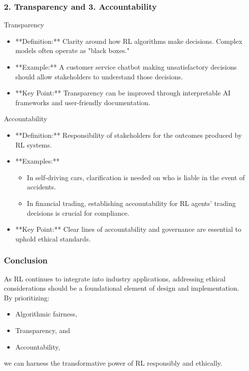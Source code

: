 \documentclass[aspectratio=169]{beamer}
\begin{document}
\begin{frame}[fragile]
    \frametitle{2. Transparency and 3. Accountability}
    \begin{block}{Transparency}
        \begin{itemize}
            \item **Definition:** Clarity around how RL algorithms make decisions. Complex models often operate as "black boxes."
            \item **Example:** A customer service chatbot making unsatisfactory decisions should allow stakeholders to understand those decisions.
            \item **Key Point:** Transparency can be improved through interpretable AI frameworks and user-friendly documentation.
        \end{itemize}
    \end{block}
    
    \begin{block}{Accountability}
        \begin{itemize}
            \item **Definition:** Responsibility of stakeholders for the outcomes produced by RL systems.
            \item **Examples:**
                \begin{itemize}
                    \item In self-driving cars, clarification is needed on who is liable in the event of accidents.
                    \item In financial trading, establishing accountability for RL agents' trading decisions is crucial for compliance.
                \end{itemize}
            \item **Key Point:** Clear lines of accountability and governance are essential to uphold ethical standards.
        \end{itemize}
    \end{block}
\end{frame}

\begin{frame}[fragile]
    \frametitle{Conclusion}
    As RL continues to integrate into industry applications, addressing ethical considerations should be a foundational element of design and implementation. By prioritizing:
    \begin{itemize}
        \item Algorithmic fairness,
        \item Transparency, and
        \item Accountability,
    \end{itemize}
    we can harness the transformative power of RL responsibly and ethically.
\end{frame}
\end{document}

